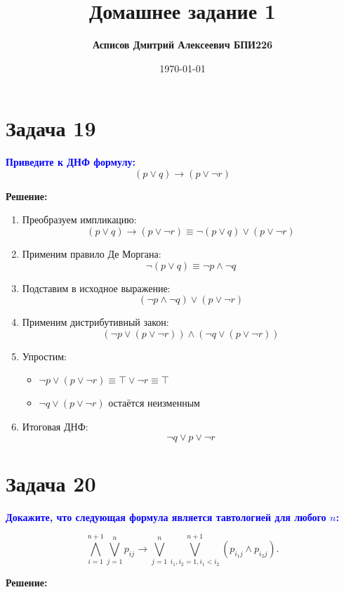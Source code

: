 \documentclass[12pt,a4paper]{article}
\title{\textbf{Домашнее задание 1}}
\author{\textbf{Асписов Дмитрий Алексеевич БПИ226}}
\date{\today}
\begin{document}
\maketitle


\section*{Задача 19}
\textcolor{blue}{\textbf{Приведите к ДНФ формулу:}}
\[
(p \vee q) \rightarrow (p \vee \neg r)
\]

\textbf{Решение:}

\begin{enumerate}[label=\arabic*., leftmargin=*]
\item Преобразуем импликацию:
   \[
   (p \vee q) \rightarrow (p \vee \neg r) 
   \equiv \neg (p \vee q) \vee (p \vee \neg r)
   \]

\item Применим правило Де Моргана:
   \[
   \neg (p \vee q) \equiv \neg p \wedge \neg q
   \]

\item Подставим в исходное выражение:
   \[
   (\neg p \wedge \neg q) \vee (p \vee \neg r)
   \]

\item Применим дистрибутивный закон:
   \[
   (\neg p \vee (p \vee \neg r)) \wedge (\neg q \vee (p \vee \neg r))
   \]

\item Упростим:
   \begin{itemize}
   \item $\neg p \vee (p \vee \neg r) \equiv \top \vee \neg r \equiv \top$
   \item $\neg q \vee (p \vee \neg r)$ остаётся неизменным
   \end{itemize}

\item Итоговая ДНФ:
   \[
   \boxed{\neg q \vee p \vee \neg r}
   \]
\end{enumerate}


\section*{Задача 20}
\textcolor{blue}{\textbf{Докажите, что следующая формула является тавтологией для любого $n$:}}

\[
\bigwedge_{i=1}^{n+1} \bigvee_{j=1}^n p_{ij} \rightarrow \bigvee_{j=1}^n \bigvee_{i_1,i_2=1, i_1<i_2}^{n+1} (p_{i_1j} \wedge p_{i_2j}).
\]

\textbf{Решение:}
\end{document}
